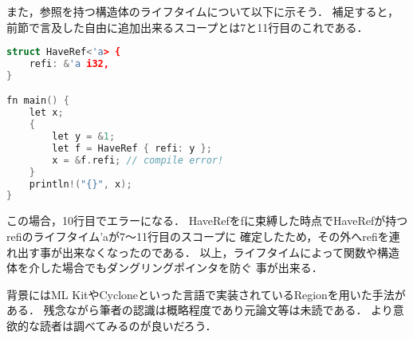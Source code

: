 また，参照を持つ構造体のライフタイムについて以下に示そう．
補足すると，前節で言及した自由に追加出来るスコープ${}$とは7と11行目のこれである．

\begin{lstlisting}[language={C++},caption=構造体のライフタイム,label=lifetime_st]
struct HaveRef<'a> {
    refi: &'a i32,
}

fn main() {
    let x;
    {
        let y = &1;
        let f = HaveRef { refi: y };
        x = &f.refi; // compile error!
    }
    println!("{}", x);
}
\end{lstlisting}

この場合，10行目でエラーになる．
HaveRefをfに束縛した時点でHaveRefが持つrefiのライフタイム'aが7〜11行目のスコープに
確定したため，その外へrefiを連れ出す事が出来なくなったのである．
以上，ライフタイムによって関数や構造体を介した場合でもダングリングポインタを防ぐ
事が出来る．

背景にはML KitやCycloneといった言語で実装されているRegionを用いた手法がある．
残念ながら筆者の認識は概略程度であり元論文等は未読である．
より意欲的な読者は調べてみるのが良いだろう．

